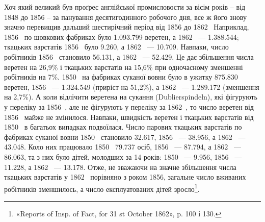 Хоч який великий був проґрес англійської промисловости
за вісім років – від 1848 до 1856 – за панування десятигодинного
робочого дня, все ж його знову значно перевищив дальший
шестирічний період від 1856 до 1862~ Наприклад, 1856~ по
шовкових фабриках було \num{1.093.799} веретен, а 1862~ — \num{1.388.544};
ткацьких варстатів 1856~ було \num{9.260}, а 1862~ — \num{10.709}. Навпаки,
число робітників 1856~ становило \num{56.131}, а 1862~ — \num{52.429}.
Це дає збільшення числа веретен на 26,9\% і ткацьких варстатів
на 15,6\% при одночасному зменшенні робітників на 7\%. 1850~ на
фабриках суканої вовни було в ужитку \num{875.830} веретен, 1856~ —
\num{1.324.549} (приріст на 51,2\%), а 1862~ — \num{1.289.172} (зменшення
на 2,7\%). А коли відлічити веретена на сукання (Dublierspindeln),
які фігурують у переліку за 1856~, але не фігурують у переліку
за 1862~, то число веретен від 1856~ майже не змінилося. Навпаки,
швидкість веретен і ткацьких варстатів від 1850~ в
багатьох випадках подвоїлася. Число парових ткацьких варстатів
по фабриках суканої вовни 1850~ становило \num{32.617},
1856~ — \num{38.956}, а 1862~ — \num{43.048}. Коло них працювало 1850~
\num{79.737} осіб, 1856~ — \num{87.794}, а 1862~ — \num{86.063}, та з них було
дітей, молодших за 14 років: 1850~ — \num{9.956}, 1856~ — \num{11.228},
а 1862~ — \num{13.178}. Отже, не зважаючи на значне збільшення
числа ткацьких варстатів у 1862~ порівняно з роком 1856, загальне
число вживаних робітників зменшилось, а число експлуатованих
дітей зросло\footnote{
«Reports of Insp. of Fact, for 31 st October 1862», p. 100 і 130.
}.

